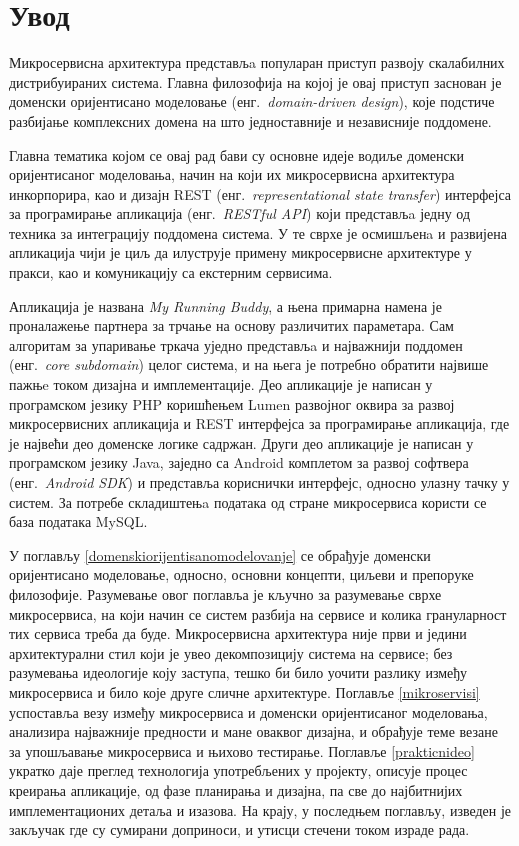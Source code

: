 \documentclass[12pt,oneside]{memoir}
\begin{document}
\frontmatter
\naslovna
\komisija
\tableofcontents*

\mainmatter

\chapter{Увод}
Микросервисна архитектура представљa популаран приступ развоју скалабилних дистрибуираних система. Главна филозофија на којој је овај приступ заснован је доменски оријентисано моделовање (енг.~\textit{domain-driven design}), које подстиче разбијање комплексних домена на што једноставније и независније поддомене.

Главна тематика којом се овај рад бави су основне идеје водиље доменски оријентисаног моделовања, начин на који их микросервисна архитектура инкорпорира, као и дизајн REST (енг.~\textit{representational state transfer}) интерфејса за програмирање апликација (енг.~\textit{RESTful API}) који представљa једну од техника за интеграцију поддомена система. У те сврхе је осмишљенa и развијена апликација чији је циљ да илуструје примену микросервисне архитектуре у пракси, као и комуникацију са екстерним сервисима.

Апликација је названа \textit{My Running Buddy}, а њена примарна намена је проналажење партнера за трчање на основу различитих параметара. Сам алгоритам за упаривање тркача уједно представљa и најважнији поддомен (енг.~\textit{core subdomain}) целог система, и на њега је потребно обратити највише пажњe током дизајна и имплементације. Део апликације је написан у програмском језику PHP коришћењем Lumen развојног оквира за развој микросервисних апликација и REST интерфејса за програмирање апликација, где је највећи део доменске логике садржан. Други део апликације је написан у програмском језику Java, заједно са Android комплетом за развој софтвера (енг.~\textit{Android SDK}) и представља кориснички интерфејс, односно улазну тачку у систем. За потребе складиштењa података од стране микросервиса користи се база података MySQL.

У поглављу \ref{domenskiorijentisanomodelovanje} се обрађује доменски оријентисано моделовање, односно, основни концепти, циљеви и препоруке филозофије. Разумевање овог поглавља је кључно за разумевање сврхе микросервиса, на који начин се систем разбија на сервисе и колика грануларност тих сервиса треба да буде. Микросервисна архитектура није први и једини архитектурални стил који је увео декомпозицију система на сервисе; без разумевања идеологије коју заступа, тешко би било уочити разлику између микросервиса и било које друге сличне архитектуре. Поглавље \ref{mikroservisi} успоставља везу између микросервиса и доменски оријентисаног моделовања, анализира најважније предности и мане оваквог дизајна, и обрађује теме везане за упошљавање микросервиса и њихово тестирање. Поглавље \ref{prakticnideo} укратко даје преглед технологија употребљених у пројекту, описује процес креирања апликације, од фазе планирања и дизајна, па све до најбитнијих имплементационих детаља и изазова. На крају, у последњем поглављу, изведен је закључак где су сумирани доприноси, и утисци стечени током израде рада.
\end{document}
